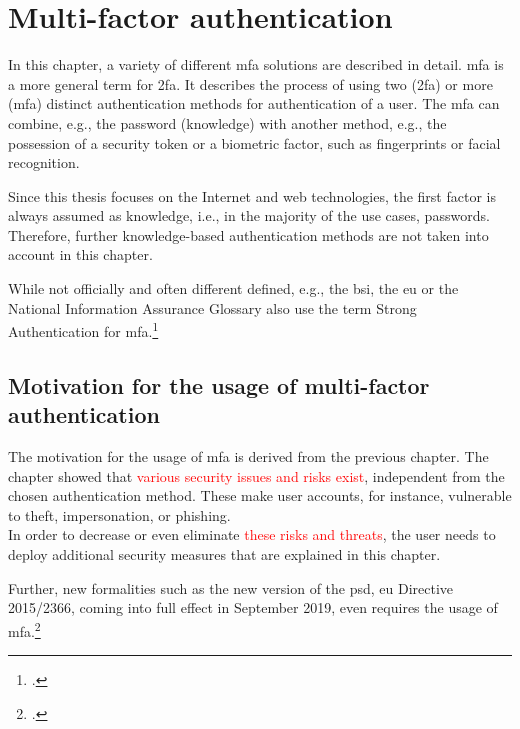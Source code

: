 \chapter{Multi-factor authentication}

In this chapter, a variety of different \gls{mfa} solutions are described in detail. \Gls{mfa} is a more general term for \gls{2fa}. It describes the process of using two (\gls{2fa}) or more (\gls{mfa}) distinct authentication methods for authentication of a user. The \gls{mfa} can combine, e.g., the password (knowledge) with another method, e.g., the possession of a security token or a biometric factor, such as fingerprints or facial recognition.

Since this thesis focuses on the Internet and web technologies, the first factor is always assumed as knowledge, i.e., in the majority of the use cases, passwords. Therefore, further knowledge-based authentication methods are not taken into account in this chapter.

While not officially and often different defined, e.g., the \gls{bsi}, the \gls{eu} or the National Information Assurance Glossary also use the term Strong Authentication for \gls{mfa}.\footcites[See][47]{CNSS4009}[See][11]{deutschland2018grundschutz}

\section{Motivation for the usage of multi-factor authentication}

The motivation for the usage of \gls{mfa} is derived from the previous chapter. The chapter showed that \textcolor{red}{various security issues and risks exist}, independent from the chosen authentication method. These make user accounts, for instance, vulnerable to theft, impersonation, or phishing.\\
 In order to decrease or even eliminate \textcolor{red}{these risks and threats}, the user needs to deploy additional security measures that are explained in this chapter.
 
 Further, new formalities such as the new version of the \gls{psd}, \gls{eu} Directive 2015/2366, coming into full effect in September 2019, even requires the usage of \gls{mfa}.\footcites[See][10]{NOCTOR20189}

\newpage

